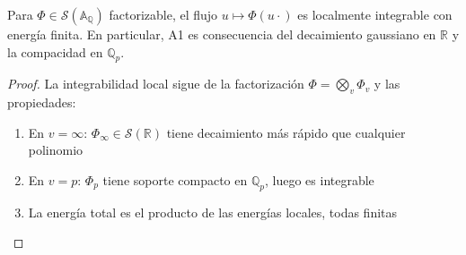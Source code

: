 \begin{lemma}
Para $\Phi\in\mathcal S(\mathbb{A}_\mathbb{Q})$ factorizable, el flujo $u\mapsto \Phi(u\cdot)$
es localmente integrable con energía finita. En particular, A1 es consecuencia del
decaimiento gaussiano en $\mathbb{R}$ y la compacidad en $\mathbb{Q}_p$.

\begin{proof}
La integrabilidad local sigue de la factorización $\Phi = \bigotimes_v \Phi_v$ y las propiedades:
\begin{enumerate}
\item En $v = \infty$: $\Phi_\infty \in \mathcal{S}(\mathbb{R})$ tiene decaimiento más rápido que cualquier polinomio
\item En $v = p$: $\Phi_p$ tiene soporte compacto en $\mathbb{Q}_p$, luego es integrable
\item La energía total es el producto de las energías locales, todas finitas
\end{enumerate}
\end{proof}
\end{lemma}


